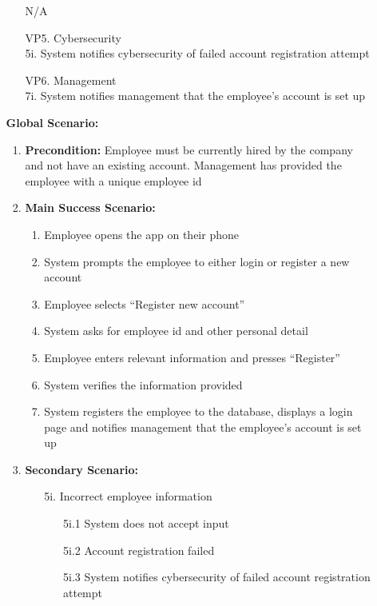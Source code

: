 \documentclass[]{article}
\begin{document}
\begin{enumerate}[{\bf BE1.}]
\begin{enumerate}[{\bf BE6.}]
\begin{enumerate}
            \indent N/A 
            \item[VP5.] Cybersecurity \\
            \indent 5i. System notifies cybersecurity of failed account registration attempt 
            \item[VP6.] Management \\
            \indent 7i. System notifies management that the employee’s account is set up 
        \end{enumerate}
        {\bf Global Scenario:}\\
        \begin{enumerate}
            \item \textbf{Precondition:} Employee must be currently hired by the company and not have an existing account. Management has provided the employee with a unique employee id 
            \item \textbf{Main Success Scenario:}
            \begin{enumerate}
                \item Employee opens the app on their phone 
                \item System prompts the employee to either login or register a new account 
                \item Employee selects “Register new account”
                \item System asks for employee id and other personal detail
                \item Employee enters relevant information and presses “Register” 
                \item System verifies the information provided
                \item System registers the employee to the database, displays a login page and notifies management that the employee’s account is set up
            \end{enumerate}
            \item \textbf{Secondary Scenario:}
            \begin{enumerate}
                \item[5i.] Incorrect employee information 
                \begin{enumerate}
                    \item[5i.1] System does not accept input
                    \item[5i.2] Account registration failed
                    \item[5i.3] System notifies cybersecurity of failed account registration attempt
                \end{enumerate}
            \end{enumerate}
        \end{enumerate}
\end{enumerate}


\end{enumerate}
\end{document}
